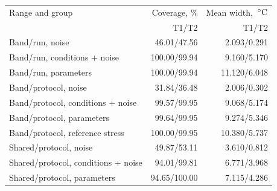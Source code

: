 \begin{tabularx}{\linewidth}{@{}Xrr@{}}
\toprule
Range and group & Coverage, \% & Mean width, $\,^\circ\mathrm{C}$\\
 & T1/T2 & T1/T2\\
\midrule
Band/run, noise & 46.01/47.56 & 2.093/0.291\\
Band/run, conditions + noise & 100.00/99.94 & 9.160/5.170\\
Band/run, parameters & 100.00/99.94 & 11.120/6.048\\
Band/protocol, noise & 31.84/36.48 & 2.006/0.302\\
Band/protocol, conditions + noise & 99.57/99.95 & 9.068/5.174\\
Band/protocol, parameters & 99.64/99.95 & 9.274/5.346\\
Band/protocol, reference stress & 100.00/99.95 & 10.380/5.737\\
Shared/protocol, noise & 49.87/53.11 & 3.610/0.812\\
Shared/protocol, conditions + noise & 94.01/99.81 & 6.771/3.968\\
Shared/protocol, parameters & 94.65/100.00 & 7.115/4.286\\
\bottomrule
\end{tabularx}
